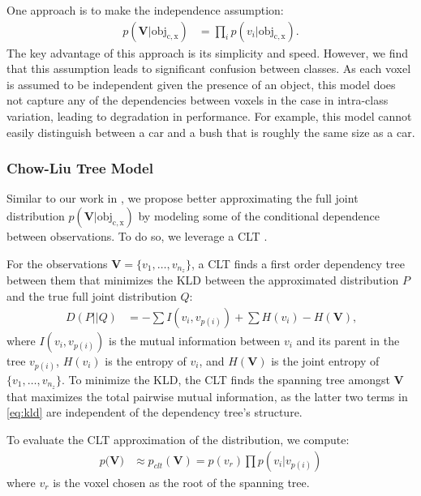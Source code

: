 One approach is to make the independence assumption:
%
\begin{align}
  p(\mathbf{V} | \mathrm{obj_{c, x}}) &= \prod_i p(v_i | \mathrm{obj_{c, x}})
  \text{.}
\end{align}
%
The key advantage of this approach is its simplicity and speed.
However, we find that this assumption leads to significant confusion between
classes. As each voxel is assumed to be independent given the presence of an
object, this model does not capture any of the dependencies between voxels in
the case in intra-class variation, leading to degradation in performance. For
example, this model cannot easily distinguish between a car and a bush that is
roughly the same size as a car.

\subsubsection{Chow-Liu Tree Model} \label{sec:clt}

Similar to our work in \cite{ushani_raybased}, we propose better approximating
the full joint distribution $p(\mathbf{V} | \mathrm{obj_{c,x}})$ by modeling
some of the conditional dependence between observations. To do so, we leverage a
\ac{CLT} \citep{chow1968approximating}.

For the observations $\mathbf{V} = \{v_1, \ldots, v_{n_z}\}$, a \ac{CLT} finds a
first order dependency tree between them that minimizes the \ac{KLD} between the
approximated distribution $P$ and the true full joint distribution $Q$:
%
\begin{align}
  D(P || Q) &= -\sum I(v_i, v_{p(i)}) + \sum H(v_i) - H(\mathbf{V})
  \label{eq:kld}
  \text{,}
\end{align}
%
where $I(v_i, v_{p(i)})$ is the mutual information between $v_i$ and its parent
in the tree $v_{p(i)}$, $H(v_i)$ is the entropy of $v_i$, and $H(\mathbf{V})$ is
the joint entropy of $\{v_1, \ldots, v_{n_z}\}$. To minimize the \ac{KLD}, the
\ac{CLT} finds the spanning tree amongst $\mathbf{V}$ that maximizes the total
pairwise mutual information, as the latter two terms in \eqref{eq:kld} are
independent of the dependency tree's structure.

To evaluate the \ac{CLT} approximation of the distribution, we compute:
%
\begin{align}
  p(\mathbf{V)} &\approx p_{clt}(\mathbf{V}) = p(v_r) \prod p(v_i | v_{p(i)})
\end{align}
%
where $v_r$ is the voxel chosen as the root of the spanning tree.

